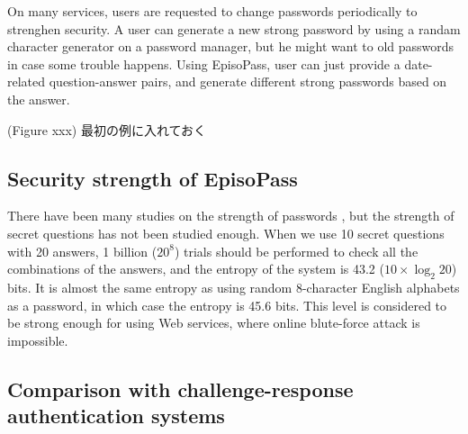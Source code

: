\documentclass{article}
\begin{document}
On many services, users are requested to change passwords periodically
to strenghen security.
A user can generate a new strong password by using a randam character generator
on a password manager, but he might want to old passwords in case some trouble happens.
Using EpisoPass, user can just provide a date-related question-answer pairs,
and generate different strong passwords based on the answer.

(Figure xxx) 最初の例に入れておく

\subsection{Security strength of EpisoPass}

There have been many studies on the strength of passwords
\cite{Hayashi:2011:DSP:1978942.1979326}%
\cite{Komanduri:2011:PPM:1978942.1979321}, %
but the strength of secret questions has not been studied enough.
%
%
When we use 10 secret questions with 20 answers,
1 billion ($20^8$) trials should be performed to check
all the combinations of the answers,
and the entropy of the system is 43.2 ($10 \times \log_2 20$) bits.  %
%
%
It is almost the same entropy as using random 8-character English alphabets
as a password, in which case the entropy is 45.6 bits.
This level is considered to be strong enough for using Web services,
where online blute-force attack is impossible\cite{Florencio:2007:SWP:1361419.1361429}.

\subsection{Comparison with challenge-response authentication systems}

\end{document}
